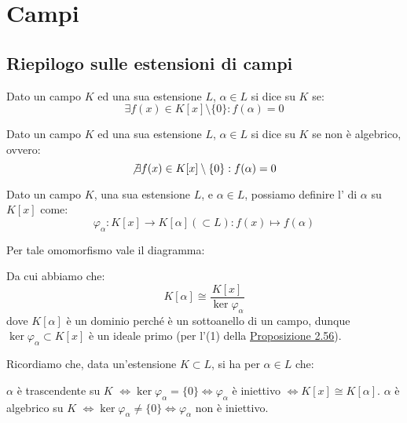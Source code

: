 \documentclass[11pt]{scrartcl}
\begin{document}
\newpage
\section{Campi}
\subsection{Riepilogo sulle estensioni di campi}
\begin{definition}
    Dato un campo $K$ ed una sua estensione $L$, $\alpha \in L$ si dice  su $K$ se:
        \[ \exists f(x) \in K[x]\setminus\{0\} : f(\alpha) = 0
        \] 
\end{definition}

\begin{definition}
    Dato un campo $K$ ed una sua estensione $L$, $\alpha \in L$ si dice  su $K$ se non è algebrico, ovvero:
        \[ \not\exists f(x) \in K[x]\setminus\{0\} : f(\alpha) = 0
        \] 
\end{definition}

\begin{definition}
    Dato un campo $K$, una sua estensione $L$, e $\alpha \in L$, possiamo definire l' di $\alpha$ su $K[x]$ come:
    \[ \varphi_{\alpha} : K[x] \longrightarrow K[\alpha] (\subset L) : f(x) \longmapsto f(\alpha)
        \]
\end{definition}

Per tale omomorfismo vale il diagramma:
\begin{center}
\end{center}

Da cui abbiamo che:
\[ K[\alpha] \cong \frac{K[x]}{\ker \varphi_{\alpha}}
    \]
dove $K[\alpha]$ è un dominio perché è un sottoanello di un campo, dunque $\ker \varphi_{\alpha} \subset K[x]$ è un ideale primo (per l'(1) della \hyperref[2.56]{Proposizione 2.56}).

\begin{remark}
    Ricordiamo che, data un'estensione $K \subset L$, si ha per $\alpha \in L$ che:
	\begin{itemize}
	\ii $\alpha$ è trascendente su $K$ $\iff \ker{\varphi_\alpha} = \{0\} \iff \varphi_\alpha$ è iniettivo $\iff K[x] \cong K[\alpha]$.
	\ii $\alpha$ è algebrico su $K$ $\iff \ker{\varphi_\alpha} \ne \{0\} \iff \varphi_\alpha$ non è iniettivo.
	\end{itemize}
\end{remark}
\end{document}
